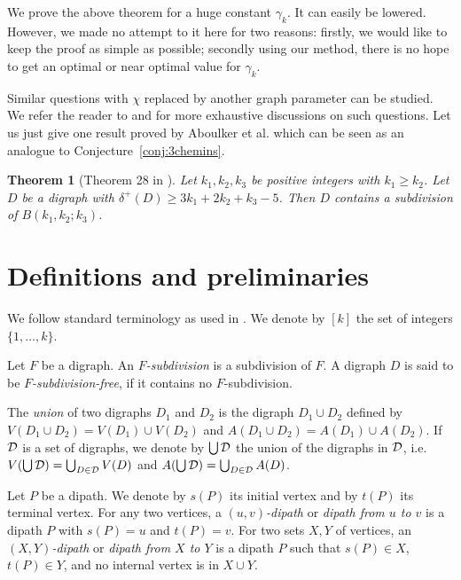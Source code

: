 \documentclass[utf8,10pt]{article}
\theoremstyle{plain}
\newtheorem{theorem}{Theorem}
\theoremstyle{definition}
\theoremstyle{remark}
\begin{document}
We prove the above theorem for a huge constant $\gamma_k$. It can easily be lowered. However, we made no attempt to it here for two reasons:
firstly, we would like to keep the proof as simple as possible; secondly using our method, there is no hope to get an optimal or near optimal value for $\gamma_k$.


\medskip

Similar questions with $\chi$ replaced by another graph parameter can be studied.
We refer the reader to \cite{AC+16} and \cite{CHLN16} for more exhaustive discussions on such questions.
Let us just give one result proved by Aboulker et al. \cite{AC+16} which can be seen as an analogue to Conjecture~\ref{conj:3chemins}.

\begin{theorem}[Theorem 28 in \cite{AC+16}]
Let $k_1,k_2,k_3$ be  positive integers with $k_1 \ge k_2$.
Let $D$ be a digraph with $\delta^+(D) \geq 3k_1+2k_2+k_3-5$. Then $D$ contains a subdivision of $B(k_1,k_2;k_3)$.
\end{theorem}


\section{Definitions and preliminaries}

We follow standard terminology as used in \cite{BoMu08}. We denote by $[k]$ the set of integers $\{1, \dots , k\}$.


\smallskip

Let $F$ be a digraph. An  {\it $F$-subdivision} is a subdivision of $F$.
A digraph $D$ is said to be {\it $F$-subdivision-free}, if it contains no $F$-subdivision.

\smallskip


The {\it union} of two digraphs $D_1$ and $D_2$ is the digraph  $D_1\cup D_2$ defined by $V(D_1\cup D_2) = V(D_1)\cup V(D_2)$ and 
$A(D_1\cup D_2) = A(D_1)\cup A(D_2)$.
If ${\cal D}$ is a set of digraphs, we denote by $\bigcup {\cal D}$ the union of the digraphs in ${\cal D}$, i.e. $V(\bigcup {\cal D}) =\bigcup_{D\in {\cal D}} V(D)$
and $A(\bigcup {\cal D}) =\bigcup_{D\in {\cal D}} A(D)$.

\smallskip


Let $P$ be a dipath. We denote by $s(P)$ its initial vertex and by $t(P)$ its terminal vertex.
For any two vertices, a {\it $(u,v)$-dipath} or {\it dipath from $u$ to $v$} is a dipath $P$ with $s(P)=u$ and $t(P)=v$.
For two sets $X,Y$ of vertices, an  {\it $(X,Y)$-dipath} or  {\it dipath from $X$ to $Y$} is a dipath $P$ such that $s(P)\in X$, $t(P)\in Y$, and no internal vertex is in $X\cup Y$.
\end{document}
